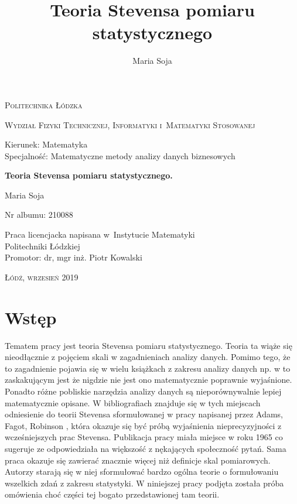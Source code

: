 \documentclass[12pt,a4paper]{report}
\author{Maria Soja}
\title{Teoria Stevensa pomiaru statystycznego}
\begin{document}
\begin{titlepage}
\begin{flushleft}
\end{flushleft}
\begin{center}
\textsc{{\huge Politechnika Łódzka}}
\end{center}
\bigskip
\bigskip
\begin{center}
\textsc{{\Large Wydział Fizyki Technicznej, Informatyki i~Matematyki Stosowanej}}
\end{center}
\bigskip
\bigskip
\begin{Large}
Kierunek: Matematyka 
\\Specjalność: Matematyczne metody analizy danych biznesowych

\end{Large}
\bigskip
\bigskip
\noindent\hrulefill
\begin{center}
{\textbf{{\Large Teoria Stevensa pomiaru statystycznego.}}}
\end{center}
\begin{flushright}
{\large 
Maria Soja

Nr albumu: 
210088
}
\end{flushright}
\noindent\hrulefill
\bigskip
\bigskip
\begin{center}
{\large Praca licencjacka
napisana w~Instytucie Matematyki 
\\Politechniki Łódzkiej 
\bigskip
\bigskip
\\Promotor: dr, mgr inż. Piotr Kowalski
 }
\end{center}
\bigskip
\bigskip
\bigskip
\bigskip
\begin{center}
{\textsc{\large Łódź, wrzesień 2019}}
\end{center}
\end{titlepage}


\tableofcontents

\chapter{Wstęp}

Tematem pracy jest teoria Stevensa pomiaru statystycznego. Teoria ta wiąże się nieodłącznie z pojęciem skali w zagadnieniach analizy danych. Pomimo tego, że to zagadnienie pojawia się w wielu książkach z zakresu analizy danych np. w {\citep{walesiak2009statystyczna}} to zaskakującym jest że nigdzie nie jest ono matematycznie poprawnie wyjaśnione. Ponadto różne pobliskie narzędzia analizy danych są nieporównywalnie lepiej matematycznie opisane. W bibliografiach znajduje się w tych miejscach odniesienie do teorii Stevensa sformułowanej w pracy napisanej przez Adams, Fagot, Robinson {\citep{adams1965theory}}, która okazuje się być próbą wyjaśnienia nieprecyzyjności z wcześniejszych prac Stevensa. Publikacja pracy miała miejsce w roku 1965 co sugeruje ze odpowiedziała na większość z nękających społeczność pytań. Sama praca okazuje się zawierać znacznie więcej niż definicje skal pomiarowych. Autorzy starają się w niej sformułować bardzo ogólna teorie o formułowaniu wszelkich zdań z zakresu statystyki. W niniejszej pracy podjęta została próba omówienia choć części tej bogato przedstawionej tam teorii. 
 
\end{document}
